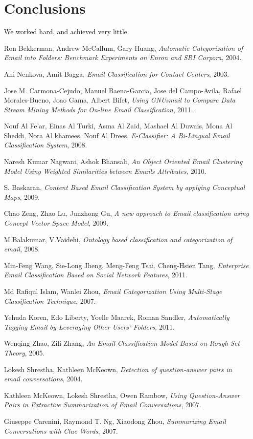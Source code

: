 \documentclass[12pt]{article}
\begin{document}
\section{Conclusions}\label{conclusions}
We worked hard, and achieved very little.


\begin{thebibliography}{99}
  Ron Bekkerman,
  Andrew McCallum,
  Gary Huang,
  \emph{Automatic Categorization of Email into Folders: Benchmark Experiments on Enron and SRI Corpora},
  2004.

  Ani Nenkova,
  Amit Bagga,
  \emph{Email Classification for Contact Centers},
  2003.

  Jose M. Carmona-Cejudo,
  Manuel Baena-Garcia,
  Jose del Campo-Avila,
  Rafael Morales-Bueno,
  Joao Gama,
  Albert Bifet,
  \emph{Using GNUsmail to Compare Data Stream Mining Methods for On-line Email Classification},
  2011.

  Nouf Al Fe'ar,
  Einas Al Turki,
  Asma Al Zaid,
  Mashael Al Duwais,
  Mona Al Sheddi,
  Nora Al khamees,
  Nouf Al Drees,
  \emph{E-Classifier: A Bi-Lingual Email Classification System},
  2008.

  Naresh Kumar Nagwani,
  Ashok Bhansali,
  \emph{An Object Oriented Email Clustering Model Using Weighted Similarities between Emails Attributes},
  2010.


  S. Baskaran,
  \emph{Content Based Email Classification System by applying Conceptual Maps},
  2009.

  Chao Zeng,
  Zhao Lu,
  Junzhong Gu,
  \emph{A new approach to Email classification using Concept Vector Space Model},
  2009.

  M.Balakumar,
  V.Vaidehi,
  \emph{Ontology based classification and categorization of email},
  2008.

  Min-Feng Wang,
  Sie-Long Jheng,
  Meng-Feng Tsai,
  Cheng-Hsien Tang,
  \emph{Enterprise Email Classification Based on Social Network Features},
  2011.

  Md Rafiqul Islam,
  Wanlei Zhou,
  \emph{Email Categorization Using Multi-Stage Classification Technique},
  2007.

  Yehuda Koren,
  Edo Liberty,
  Yoelle Maarek,
  Roman Sandler,
  \emph{Automatically Tagging Email by Leveraging Other Users' Folders},
  2011.

  Wenqing Zhao,
  Zili Zhang,
  \emph{An Email Classification Model Based on Rough Set Theory},
  2005.

  Lokesh Shrestha,
  Kathleen McKeown,
  \emph{Detection of question-answer pairs in email conversations},
  2004.

  Kathleen McKeown,
  Lokesh Shrestha,
  Owen Rambow,
  \emph{Using Question-Answer Pairs in Extractive Summarization of Email Conversations},
  2007.

  Giuseppe Carenini,
  Raymond T. Ng,
  Xiaodong Zhou,
  \emph{Summarizing Email Conversations with Clue Words},
  2007.
\end{thebibliography}
\end{document}
